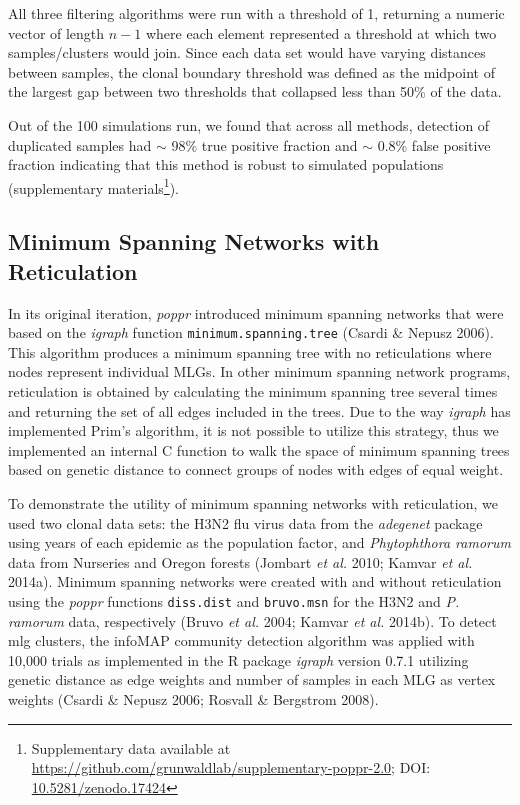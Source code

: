 \documentclass[double,12pt]{beavtex}
\begin{document}
  All three filtering algorithms were run with a threshold of 1, returning
  a numeric vector of length \(n - 1\) where each element represented a
  threshold at which two samples/clusters would join. Since each data set
  would have varying distances between samples, the clonal boundary
  threshold was defined as the midpoint of the largest gap between two
  thresholds that collapsed less than 50\% of the data.
  
  Out of the 100 simulations run, we found that across all methods,
  detection of duplicated samples had \(\sim\) 98\% true positive fraction
  and \(\sim\) 0.8\% false positive fraction indicating that this method
  is robust to simulated populations (supplementary materials\footnote{Supplementary
    data available at
    \url{https://github.com/grunwaldlab/supplementary-poppr-2.0}; DOI:
    \href{http://dx.doi.org/10.5281/zenodo.17424}{10.5281/zenodo.17424}}).
  
  \subsection{Minimum Spanning Networks with
  Reticulation}\label{minimum-spanning-networks-with-reticulation}
  
  In its original iteration, \emph{poppr} introduced minimum spanning
  networks that were based on the \emph{igraph} function
  \texttt{minimum.spanning.tree} (Csardi \& Nepusz 2006). This algorithm
  produces a minimum spanning tree with no reticulations where nodes
  represent individual MLGs. In other minimum spanning network programs,
  reticulation is obtained by calculating the minimum spanning tree
  several times and returning the set of all edges included in the trees.
  Due to the way \emph{igraph} has implemented Prim's algorithm, it is not
  possible to utilize this strategy, thus we implemented an internal C
  function to walk the space of minimum spanning trees based on genetic
  distance to connect groups of nodes with edges of equal weight.
  
  To demonstrate the utility of minimum spanning networks with
  reticulation, we used two clonal data sets: the H3N2 flu virus data from
  the \emph{adegenet} package using years of each epidemic as the
  population factor, and \emph{Phytophthora ramorum} data from Nurseries
  and Oregon forests (Jombart \emph{et al.} 2010; Kamvar \emph{et al.}
  2014a). Minimum spanning networks were created with and without
  reticulation using the \emph{poppr} functions \texttt{diss.dist} and
  \texttt{bruvo.msn} for the H3N2 and \emph{P. ramorum} data, respectively
  (Bruvo \emph{et al.} 2004; Kamvar \emph{et al.} 2014b). To detect mlg
  clusters, the infoMAP community detection algorithm was applied with
  10,000 trials as implemented in the R package \emph{igraph} version
  0.7.1 utilizing genetic distance as edge weights and number of samples
  in each MLG as vertex weights (Csardi \& Nepusz 2006; Rosvall \&
  Bergstrom 2008).
  
\end{document}
